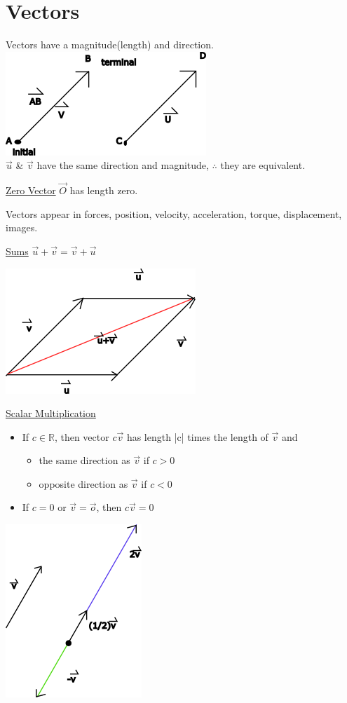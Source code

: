 \documentclass[10pt]{article}
\begin{document}
\section{Vectors}
Vectors have a magnitude(length) and direction.\\
\includegraphics{somevectors}\\ $\vec{u}$ \& $\vec{v}$ have the same direction and magnitude, $\therefore$ they are equivalent.

\bigskip
\underline{Zero Vector} $\vec{O}$ has length zero. 

\bigskip
Vectors appear in forces, position, velocity, acceleration, torque, displacement, images.

\underline{Sums} $\vec{u}+\vec{v} = \vec{v}+\vec{u}$ 
 
\includegraphics{sumvector} 
 
\underline{Scalar Multiplication}
\begin{itemize}
	\item If $c\in\mathbb{R}$, then vector $c \vec{v}$ has length |c| times the length of $\vec{v}$ and \begin{itemize} 
		\item the same direction as $\vec{v}$ if $c > 0$ 
		\item opposite direction as $\vec{v}$ if $c < 0$ 
	\end{itemize}
	\item If $c=0$ or $\vec{v} = \vec{o}$, then $c \vec{v} = 0$ 
\end{itemize}

\includegraphics{scalarmult}
\end{document}
